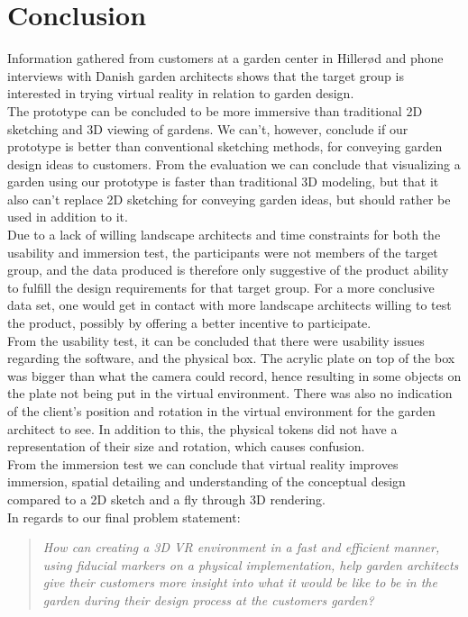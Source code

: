 \chapter{Conclusion}
Information gathered from customers at a garden center in Hillerød and phone interviews with Danish garden architects shows that the target group is interested in trying virtual reality in relation to garden design.\\

The prototype can be concluded to be more immersive than traditional 2D sketching and 3D viewing of gardens. We can't, however, conclude if our prototype is better than conventional sketching methods, for conveying garden design ideas to customers. From the evaluation we can conclude that visualizing a garden using our prototype is faster than traditional 3D modeling, but that it also can't replace 2D sketching for conveying garden ideas, but should rather be used in addition to it.\\

Due to a lack of willing landscape architects and time constraints for both the usability and immersion test, the participants were not members of the target group, and the data produced is therefore only suggestive of the product ability to fulfill the design requirements for that target group. For a more conclusive data set, one would get in contact with more landscape architects willing to test the product, possibly by offering a better incentive to participate.\\

From the usability test, it can be concluded that there were usability issues regarding the software, and the physical box. The acrylic plate on top of the box was bigger than what the camera could record, hence resulting in some objects on the plate not being put in the virtual environment. There was also no indication of the client's position and rotation in the virtual environment for the garden architect to see. In addition to this, the physical tokens did not have a representation of their size and rotation, which causes confusion.\\


From the immersion test we can conclude that virtual reality improves immersion, spatial detailing and understanding of the conceptual design compared to a 2D sketch and a fly through 3D rendering.\\

In regards to our final problem statement:\\
\begin{quote}
	\textit{How can creating a 3D VR environment in a fast and efficient manner, using fiducial markers on a physical implementation, help garden architects give their customers more insight into what it would be like to be in the garden during their design process at the customers garden?}\\
\end{quote}

